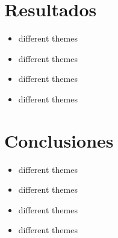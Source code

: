 \section{Resultados}
\begin{frame}
    \begin{itemize}
        \item different themes
        \item different themes
        \item different themes
        \item different themes
    \end{itemize}
\end{frame}

\section{Conclusiones}
\begin{frame}
    \begin{itemize}
        \item different themes
        \item different themes
        \item different themes
        \item different themes
    \end{itemize}
\end{frame}